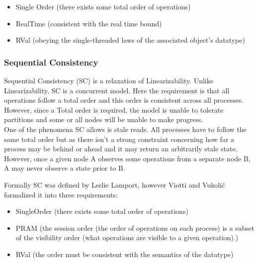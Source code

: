 \documentclass[a4paper,10pt,titlepage]{report}
\begin{document}
    \begin{itemize}
        \item Single Order (there exists some total order of operations)
        \item RealTime (consistent with the real time bound)
        \item RVal (obeying the single-threaded laws of the associated object's datatype)
    \end{itemize}


    \subsubsection{Sequential Consistency}
    Sequential Consistency (SC) is a relaxation of Linearizability. Unlike Linearizability, SC is a concurrent model. Here the requirement is that all operations follow a total order and this order is consistent across all processes. However, since a Total order is required, the model is unable to tolerate partitions and some or all nodes will be unable to make progress. 
\\ \vspace{5mm}
    One of the phenomena SC allows is stale reads. All processes have to follow the same total order but as there isn't a strong constraint concerning how far a process may be behind or ahead and it may return an arbitrarily stale state. However, once a given node A observes some operations from a separate node B, A may never observe a state prior to B.

    Formally SC was defined by Leslie Lamport\cite{Lamport1979how}, however Viotti and Vukolić\cite{ConsistencyinNonTransactionalDistributedStorageSystems} formalized it into three requirements:
    \begin{itemize}
        \item SingleOrder (there exists some total order of operations)
        \item PRAM (the session order (the order of operations on each process) is a subset of the visibility order (what operations are visible to a given operation).)
        \item RVal (the order must be consistent with the semantics of the datatype)
    \end{itemize}


\end{document}
